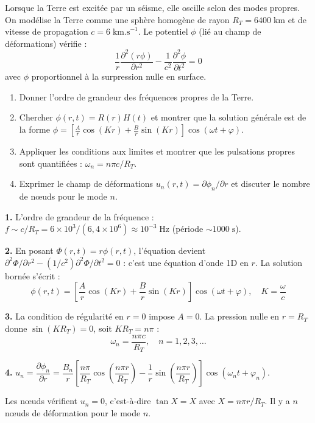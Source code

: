 \documentclass[12pt,a4paper]{article}
\begin{document}
\begin{boiteexercice}
Lorsque la Terre est excitée par un séisme, elle oscille selon des modes propres. On modélise la Terre comme une sphère homogène de rayon $R_T = 6400\;\text{km}$ et de vitesse de propagation $c = 6\;\text{km.s}^{-1}$. Le potentiel $\phi$ (lié au champ de déformations) vérifie :
\[
\frac{1}{r}\frac{\partial^2(r\phi)}{\partial r^2} - \frac{1}{c^2}\frac{\partial^2\phi}{\partial t^2} = 0
\]
avec $\phi$ proportionnel à la surpression nulle en surface.
\begin{enumerate}
  \item Donner l'ordre de grandeur des fréquences propres de la Terre.
  \item Chercher $\phi(r,t) = R(r)H(t)$ et montrer que la solution générale est de la forme $\phi = \left[\frac{A}{r}\cos(Kr) + \frac{B}{r}\sin(Kr)\right]\cos(\omega t + \varphi)$.
  \item Appliquer les conditions aux limites et montrer que les pulsations propres sont quantifiées : $\omega_n = n\pi c/R_T$.
  \item Exprimer le champ de déformations $u_n(r,t) = \partial\phi_n/\partial r$ et discuter le nombre de n\oe{}uds pour le mode $n$.
\end{enumerate}
\end{boiteexercice}

\begin{boitecorrige}
\textbf{1.} L'ordre de grandeur de la fréquence : $f \sim c/R_T = 6\times10^3/(6{,}4\times10^6) \approx 10^{-3}\;\text{Hz}$ (période $\sim 1000\;\text{s}$).

\textbf{2.} En posant $\Phi(r,t) = r\phi(r,t)$, l'équation devient $\partial^2\Phi/\partial r^2 - (1/c^2)\partial^2\Phi/\partial t^2 = 0$ : c'est une équation d'onde 1D en $r$. La solution bornée s'écrit :
\[
\phi(r,t) = \left[\frac{A}{r}\cos(Kr) + \frac{B}{r}\sin(Kr)\right]\cos(\omega t + \varphi), \quad K = \frac{\omega}{c}
\]

\textbf{3.} La condition de régularité en $r=0$ impose $A = 0$. La pression nulle en $r = R_T$ donne $\sin(KR_T) = 0$, soit $KR_T = n\pi$ :
\[
\omega_n = \frac{n\pi c}{R_T}, \quad n = 1, 2, 3, \ldots
\]

\textbf{4.} $u_n = \dfrac{\partial\phi_n}{\partial r} = \dfrac{B_n}{r}\!\left[\dfrac{n\pi}{R_T}\cos\!\left(\dfrac{n\pi r}{R_T}\right) - \dfrac{1}{r}\sin\!\left(\dfrac{n\pi r}{R_T}\right)\right]\cos(\omega_n t + \varphi_n)$.

Les n\oe{}uds vérifient $u_n = 0$, c'est-à-dire $\tan X = X$ avec $X = n\pi r/R_T$. Il y a $n$ n\oe{}uds de déformation pour le mode $n$.
\end{boitecorrige}
\end{document}
